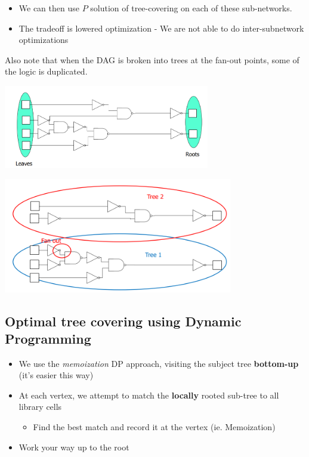 \documentclass{article}
\begin{document}
\begin{itemize}
    \item We can then use $P$ solution of tree-covering on each of these sub-networks.
    \item The tradeoff is lowered optimization - We are not able to do inter-subnetwork optimizations
\end{itemize}

\vspace{0.5cm}
Also note that when the DAG is broken into trees at the fan-out points, some of the logic is duplicated.

\begin{minipage}[t]{0.5\textwidth}
    \centering
    \includegraphics[width=9cm, scale=1]{S6/fanout.PNG}
    \captionsetup{justification=centering}
\end{minipage}%
\begin{minipage}[t]{0.5\textwidth}
    \centering
    \includegraphics[width=10cm, scale=1]{S6/brokenDAG.PNG}
\end{minipage}%

\newpage
\subsection{Optimal tree covering using Dynamic Programming}
\begin{itemize}
    \item We use the \textit{memoization} DP approach, visiting the subject tree \textbf{bottom-up} (it's easier this way)
    \item At each vertex, we attempt to match the \textbf{locally} rooted sub-tree to all library cells
        \begin{itemize}
            \item Find the best match and record it at the vertex (ie. Memoization)
        \end{itemize}
    \item Work your way up to the root
\end{itemize}
\end{document}
